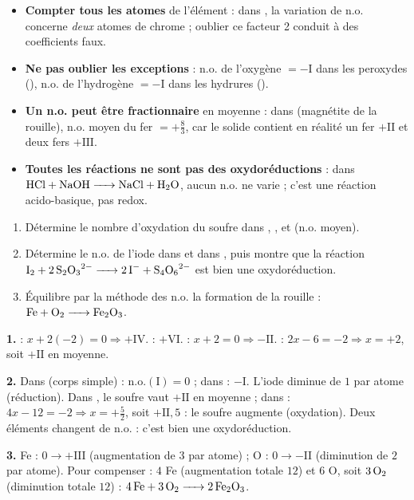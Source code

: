 \documentclass[11pt]{article}
\begin{document}
\begin{attention}
\begin{itemize}
\item \textbf{Compter tous les atomes} de l'élément : dans , la variation de n.o. concerne \emph{deux} atomes de chrome ; oublier ce facteur 2 conduit à des coefficients faux.
\item \textbf{Ne pas oublier les exceptions} : n.o. de l'oxygène $= -\mathrm{I}$ dans les peroxydes (), n.o. de l'hydrogène $= -\mathrm{I}$ dans les hydrures ().
\item \textbf{Un n.o. peut être fractionnaire} en moyenne : dans  (magnétite de la rouille), n.o. moyen du fer $= +\frac{8}{3}$, car le solide contient en réalité un fer $+\mathrm{II}$ et deux fers $+\mathrm{III}$.
\item \textbf{Toutes les réactions ne sont pas des oxydoréductions} : dans $\ce{HCl + NaOH -> NaCl + H2O}$, aucun n.o. ne varie ; c'est une réaction acido-basique, pas redox.
\end{itemize}
\end{attention}

\begin{exercice}
\begin{enumerate}
\item Détermine le nombre d'oxydation du soufre dans , ,  et  (n.o. moyen).
\item Détermine le n.o. de l'iode dans  et dans , puis montre que la réaction $\ce{I2 + 2 S2O3^2- -> 2 I- + S4O6^2-}$ est bien une oxydoréduction.
\item Équilibre par la méthode des n.o. la formation de la rouille : $\ce{Fe + O2 -> Fe2O3}$.
\end{enumerate}
\end{exercice}

\begin{corrige}[Exercice]
\textbf{1.}  : $x + 2(-2) = 0 \Rightarrow +\mathrm{IV}$.  : $+\mathrm{VI}$.  : $x + 2 = 0 \Rightarrow -\mathrm{II}$.  : $2x - 6 = -2 \Rightarrow x = +2$, soit $+\mathrm{II}$ en moyenne.

\textbf{2.} Dans  (corps simple) : n.o.$(\mathrm{I}) = 0$ ; dans  : $-\mathrm{I}$. L'iode diminue de $1$ par atome (réduction). Dans , le soufre vaut $+\mathrm{II}$ en moyenne ; dans  : $4x - 12 = -2 \Rightarrow x = +\frac{5}{2}$, soit $+\mathrm{II{,}5}$ : le soufre augmente (oxydation). Deux éléments changent de n.o. : c'est bien une oxydoréduction.

\textbf{3.} Fe : $0 \rightarrow +\mathrm{III}$ (augmentation de $3$ par atome) ; O : $0 \rightarrow -\mathrm{II}$ (diminution de $2$ par atome). Pour compenser : $4$ Fe (augmentation totale $12$) et $6$ O, soit $3\,\ce{O2}$ (diminution totale $12$) : $\ce{4 Fe + 3 O2 -> 2 Fe2O3}$.
\end{corrige}
\end{document}
